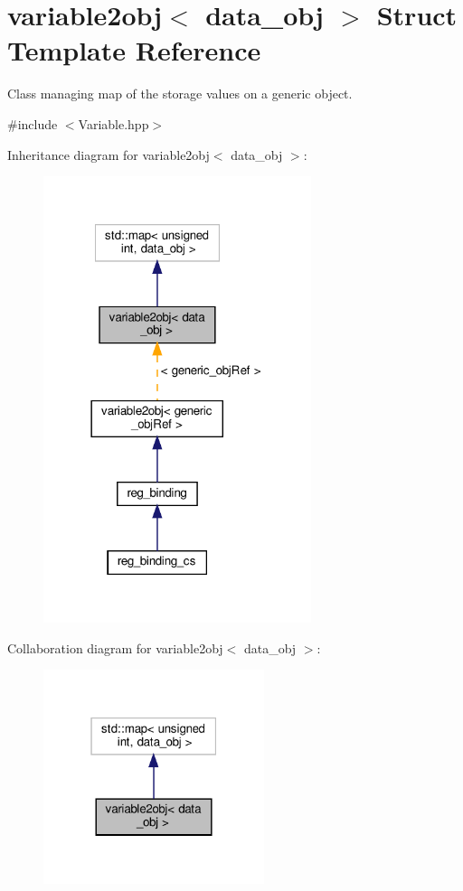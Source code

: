 \hypertarget{structvariable2obj}{}\section{variable2obj$<$ data\+\_\+obj $>$ Struct Template Reference}
\label{structvariable2obj}


Class managing map of the storage values on a generic object.  




{\ttfamily \#include $<$Variable.\+hpp$>$}



Inheritance diagram for variable2obj$<$ data\+\_\+obj $>$\+:
\nopagebreak
\begin{figure}[H]
\begin{center}
\leavevmode
\includegraphics[width=222pt]{d4/d1e/structvariable2obj__inherit__graph}
\end{center}
\end{figure}


Collaboration diagram for variable2obj$<$ data\+\_\+obj $>$\+:
\nopagebreak
\begin{figure}[H]
\begin{center}
\leavevmode
\includegraphics[width=183pt]{d3/d2c/structvariable2obj__coll__graph}
\end{center}
\end{figure}
